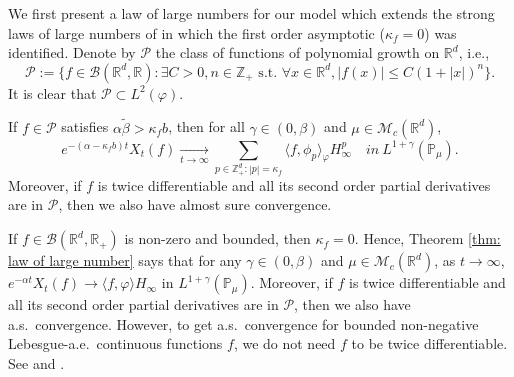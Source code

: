 \documentclass[EJP]{ejpecp} %
\begin{document}
	We first present a law of large numbers for our model which extends the strong laws of large numbers of \cite{ChenRenYang2019Skeleton, EckhoffKyprianouWinkel2015Spines} in which the first order asymptotic ($\kappa_f=0$) was identified.
	Denote by $\mathcal P$ the class of functions of polynomial growth on $\mathbb R^d$, i.e.,
\begin{equation}
\label{eq: polynomial growth function}
  	\mathcal{P}
  	:= \{f\in \mathcal B(\mathbb R^d, \mathbb R):\exists C>0, n \in \mathbb Z_+ \text{~s.t.~} \forall x\in \mathbb R^d, |f(x)|\leq C(1+|x|)^n \}.
\end{equation}
	It is clear that $\mathcal{P} \subset L^2(\varphi)$.
\begin{theorem}
\label{thm: law of large number}
 	If $f \in \mathcal{P}$ satisfies $\alpha\tilde \beta>\kappa_f b$, then for all $\gamma\in (0, \beta)$ and  $\mu\in \mathcal M_c(\mathbb R^d)$,
\[
   	e^{-(\alpha-\kappa_fb)t}X_t(f)
    \xrightarrow[t\to \infty]{}\sum_{p\in \mathbb Z_+^d:|p|=\kappa_f}\langle f, \phi_p\rangle_{\varphi} H_{\infty}^p
    \quad in~ L^{1+\gamma}(\mathbb{P}_{\mu}).
\]
	Moreover, if $f$ is twice differentiable and all its second order partial derivatives are in $\mathcal{P}$, then we also have almost sure convergence.
\end{theorem}
	If $f\in \mathcal B(\mathbb R^d, \mathbb R_+)$ is 
	non-zero and  bounded, then $\kappa_f=0$.
	Hence, Theorem \ref{thm: law of large number} says that for any $\gamma\in (0, \beta)$ and  $\mu\in \mathcal M_c(\mathbb R^d)$, as $t\rightarrow \infty$, $e^{-\alpha t}X_t(f) \rightarrow \langle f, \varphi\rangle H_{\infty}$ in $L^{1+\gamma}(\mathbb{P}_{\mu})$.
	Moreover, if $f$ is twice differentiable and all its second order partial derivatives are in $\mathcal{P}$, then we also have a.s.\ convergence.
	However, to get a.s.\ convergence for bounded non-negative Lebesgue-a.e.\ continuous functions $f$, we do not need $f$ to be twice differentiable.
	See \cite[Theorem 2.13 \& Example 8.1]{ChenRenYang2019Skeleton} and \cite[Theorem 1.2 \& Example 4.1]{EckhoffKyprianouWinkel2015Spines}.
\end{document}
